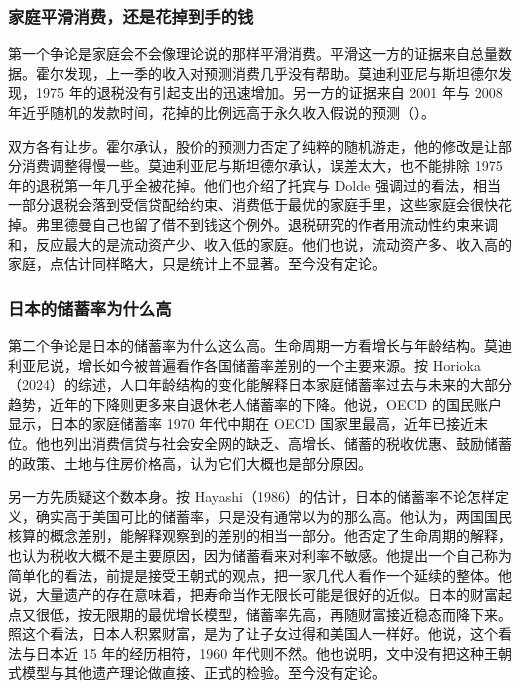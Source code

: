 \subsubsection{家庭平滑消费，还是花掉到手的钱}

第一个争论是家庭会不会像理论说的那样平滑消费。平滑这一方的证据来自总量数据。霍尔发现，上一季的收入对预测消费几乎没有帮助\cite{hall1978}。莫迪利亚尼与斯坦德尔发现，1975 年的退税没有引起支出的迅速增加\cite{ms1977}。另一方的证据来自 2001 年与 2008 年近乎随机的发款时间，花掉的比例远高于永久收入假说的预测（）。

双方各有让步。霍尔承认，股价的预测力否定了纯粹的随机游走，他的修改是让部分消费调整得慢一些\cite{hall1978}。莫迪利亚尼与斯坦德尔承认，误差太大，也不能排除 1975 年的退税第一年几乎全被花掉\cite{ms1977}。他们也介绍了托宾与 Dolde 强调过的看法，相当一部分退税会落到受信贷配给约束、消费低于最优的家庭手里，这些家庭会很快花掉\cite{ms1977}。弗里德曼自己也留了借不到钱这个例外\cite{friedman1957}。退税研究的作者用流动性约束来调和，反应最大的是流动资产少、收入低的家庭\cite{jps2004}。他们也说，流动资产多、收入高的家庭，点估计同样略大，只是统计上不显著\cite{jps2004}。至今没有定论。

\subsubsection{日本的储蓄率为什么高}

第二个争论是日本的储蓄率为什么这么高。生命周期一方看增长与年龄结构。莫迪利亚尼说，增长如今被普遍看作各国储蓄率差别的一个主要来源\cite{modigliani1985}。按 Horioka（2024）的综述，人口年龄结构的变化能解释日本家庭储蓄率过去与未来的大部分趋势，近年的下降则更多来自退休老人储蓄率的下降\cite{horioka2024}。他说，OECD 的国民账户显示，日本的家庭储蓄率 1970 年代中期在 OECD 国家里最高，近年已接近末位\cite{horioka2024}。他也列出消费信贷与社会安全网的缺乏、高增长、储蓄的税收优惠、鼓励储蓄的政策、土地与住房价格高，认为它们大概也是部分原因\cite{horioka2024}。

另一方先质疑这个数本身。按 Hayashi（1986）的估计，日本的储蓄率不论怎样定义，确实高于美国可比的储蓄率，只是没有通常以为的那么高\cite{hayashi1986}。他认为，两国国民核算的概念差别，能解释观察到的差别的相当一部分\cite{hayashi1986}。他否定了生命周期的解释，也认为税收大概不是主要原因，因为储蓄看来对利率不敏感\cite{hayashi1986}。他提出一个自己称为简单化的看法，前提是接受王朝式的观点，把一家几代人看作一个延续的整体\cite{hayashi1986}。他说，大量遗产的存在意味着，把寿命当作无限长可能是很好的近似\cite{hayashi1986}。日本的财富起点又很低，按无限期的最优增长模型，储蓄率先高，再随财富接近稳态而降下来\cite{hayashi1986}。照这个看法，日本人积累财富，是为了让子女过得和美国人一样好\cite{hayashi1986}。他说，这个看法与日本近 15 年的经历相符，1960 年代则不然\cite{hayashi1986}。他也说明，文中没有把这种王朝式模型与其他遗产理论做直接、正式的检验\cite{hayashi1986}。至今没有定论。

